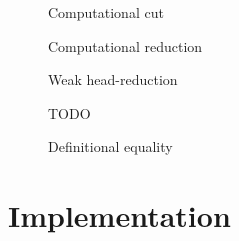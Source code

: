 \documentclass[9pt]{sigplanconf}
\begin{document}
\begin{figure*}
  \qquad
  {Computational cut}

  \begin{mathpar}

  \end{mathpar}

  \qquad
  {Computational reduction}

  \begin{mathpar}




  \end{mathpar}

  \caption{Weak head-reduction}
  \label{fig:whr}
\end{figure*}

\begin{figure*}
  \centering
  TODO
  \caption{Definitional equality}
  \label{fig:def-eq}
\end{figure*}

\section{Implementation}
\label{sec:implem}
\end{document}
